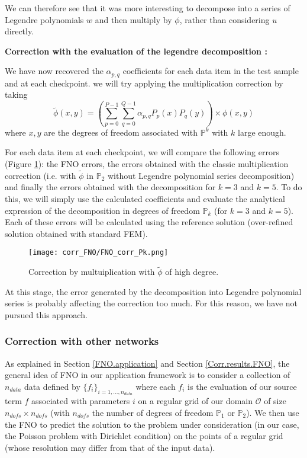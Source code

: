 We can therefore see that it was more interesting to decompose into a series of Legendre polynomials $w$ and then multiply by $\phi$, rather than considering $u$ directly.

\textbf{Correction with the evaluation of the legendre decomposition :}

We have now recovered the $\alpha_{p,q}$ coefficients for each data item in the test sample and at each checkpoint. we will try applying the multiplication correction by taking 
\begin{equation*}
	\tilde{\phi}(x,y)=\left(\sum_{p=0}^{P-1}\sum_{q=0}^{Q-1}\alpha_{p,q} P_p(x)P_q(y)\right)\times \phi(x,y)
\end{equation*}
where $x,y$ are the degrees of freedom associated with $\mathbb{P}^k$ with $k$ large enough.

For each data item at each checkpoint, we will compare the following errors (Figure \ref{FNO_corr_Pk}): the FNO errors, the errors obtained with the classic multiplication correction (i.e. with $\tilde{\phi}$ in $\mathbb{P}_2$ without Legendre polynomial series decomposition) and finally the errors obtained with the decomposition for $k=3$ and $k=5$. To do this, we will simply use the calculated coefficients and evaluate the analytical expression of the decomposition in degrees of freedom $\mathbb{P}_k$ (for $k=3$ and $k=5$). Each of these errors will be calculated using the reference solution (over-refined solution obtained with standard FEM).

\begin{figure}[H]
	\centering
	\texttt{[image: corr\_FNO/FNO\_corr\_Pk.png]}
	\caption{Correction by multuiplication with $\tilde{\phi}$ of high degree.}
	\label{FNO_corr_Pk}
\end{figure} 

At this stage, the error generated by the decomposition into Legendre polynomial series is probably affecting the correction too much. For this reason, we have not pursued this approach.

\subsubsection{Correction with other networks} \label{Corr.results.neural_net}

As explained in Section \ref{FNO.application} and Section \ref{Corr.results.FNO}, the general idea of FNO in our application framework is to consider a collection of $n_{data}$ data defined by $\{f_i\}_{i=1,\dots, n_{data}}$ where each $f_i$ is the evaluation of our source term $f$ associated with parameters $i$ on a regular grid of our domain $\mathcal{O}$ of size $n_{dofs}\times n_{dofs}$ (with $n_{dofs}$ the number of degrees of freedom $\mathbb{P}_1$ or $\mathbb{P}_2$). 
We then use the FNO to predict the solution to the problem under consideration (in our case, the Poisson problem with Dirichlet condition) on the points of a regular grid (whose resolution may differ from that of the input data). 

